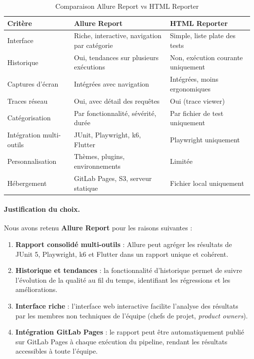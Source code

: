 \begin{table}[H]
\centering
\caption{Comparaison Allure Report vs HTML Reporter}
\label{tab:allure-vs-html}
\renewcommand{\arraystretch}{1.3}
\begin{tabularx}{\textwidth}{|l|X|X|}
\hline
\rowcolor{speedlineBlue!15}
\textbf{Critère} & \textbf{Allure Report} & \textbf{HTML Reporter} \\
\hline
Interface & Riche, interactive, navigation par catégorie & Simple, liste plate des tests \\
\hline
Historique & Oui, tendances sur plusieurs exécutions & Non, exécution courante uniquement \\
\hline
Captures d'écran & Intégrées avec navigation & Intégrées, moins ergonomiques \\
\hline
Traces réseau & Oui, avec détail des requêtes & Oui (trace viewer) \\
\hline
Catégorisation & Par fonctionnalité, sévérité, durée & Par fichier de test uniquement \\
\hline
Intégration multi-outils & JUnit, Playwright, k6, Flutter & Playwright uniquement \\
\hline
Personnalisation & Thèmes, plugins, environnements & Limitée \\
\hline
Hébergement & GitLab Pages, S3, serveur statique & Fichier local uniquement \\
\hline
\end{tabularx}
\end{table}

\paragraph{Justification du choix.}
Nous avons retenu \textbf{Allure Report} pour les raisons suivantes :
\begin{enumerate}[nosep]
    \item \textbf{Rapport consolidé multi-outils} : Allure peut agréger les résultats de JUnit 5, Playwright, k6 et Flutter dans un rapport unique et cohérent.
    \item \textbf{Historique et tendances} : la fonctionnalité d'historique permet de suivre l'évolution de la qualité au fil du temps, identifiant les régressions et les améliorations.
    \item \textbf{Interface riche} : l'interface web interactive facilite l'analyse des résultats par les membres non techniques de l'équipe (chefs de projet, \textit{product owners}).
    \item \textbf{Intégration GitLab Pages} : le rapport peut être automatiquement publié sur GitLab Pages à chaque exécution du pipeline, rendant les résultats accessibles à toute l'équipe.
\end{enumerate}

